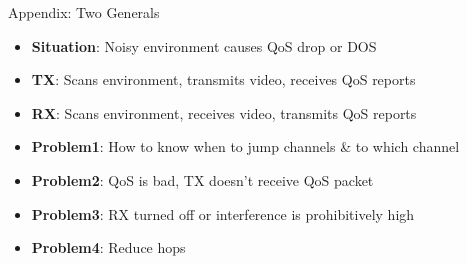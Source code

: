 \documentclass[12pt]{beamer}
\begin{document}
\begin{frame}{Appendix: Two Generals}
    \begin{itemize}
\item \textbf{Situation}: Noisy environment causes QoS drop or DOS
\item \textbf{TX}: Scans environment, transmits video, receives QoS reports
\item \textbf{RX}: Scans environment, receives video, transmits QoS reports
\item \textbf{Problem1}: How to know when to jump channels \& to which channel
\item \textbf{Problem2}: QoS is bad, TX doesn't receive QoS packet
\item \textbf{Problem3}: RX turned off or interference is prohibitively high
\item \textbf{Problem4}: Reduce hops
\end{itemize}
\end{frame}



\end{document}
